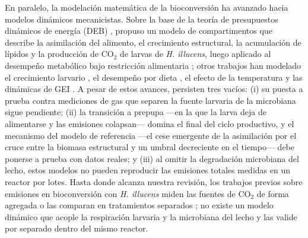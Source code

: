 En paralelo, la modelación matemática de la bioconversión ha avanzado hacia modelos dinámicos mecanicistas. Sobre la base de la teoría de presupuestos dinámicos de energía (DEB) \parencite{kooijmanDynamicEnergyBudget2009}, \textcite{eriksenDynamicModellingFeed2022} propuso un modelo de compartimentos que describe la asimilación del alimento, el crecimiento estructural, la acumulación de lípidos y la producción de CO$_2$ de larvas de \textit{H. illucens}, luego aplicado al desempeño metabólico bajo restricción alimentaria \parencite{eriksenMetabolicPerformanceFeed2024}; otros trabajos han modelado el crecimiento larvario \parencite{padmanabhaComprehensiveDynamicGrowth2020}, el desempeño por dieta \parencite{laganaroGrowthMetabolicPerformance2021a}, el efecto de la temperatura \parencite{schonEffectTemperatureGrowth2024} y las dinámicas de GEI \parencite{rossiEstimatingDynamicsGreenhouse2024a}. A pesar de estos avances, persisten tres vacíos: (i) su puesta a prueba contra mediciones de gas que separen la fuente larvaria de la microbiana sigue pendiente; (ii) la transición a prepupa ---en la que la larva deja de alimentarse y las emisiones colapsan--- domina el final del ciclo productivo, y el mecanismo del modelo de referencia ---el cese emergente de la asimilación por el cruce entre la biomasa estructural y un umbral decreciente en el tiempo--- debe ponerse a prueba con datos reales; y (iii) al omitir la degradación microbiana del lecho, estos modelos no pueden reproducir las emisiones totales medidas en un reactor por lotes. Hasta donde alcanza nuestra revisión, los trabajos previos sobre emisiones en bioconversión con \textit{H. illucens} miden las fuentes de CO$_2$ de forma agregada o las comparan en tratamientos separados \parencite{ermolaevGreenhouseGasEmissions2019,parodiBioconversionEfficienciesGreenhouse2020a,peredniaComparisonGreenhouseGas2017}; no existe un modelo dinámico que acople la respiración larvaria y la microbiana del lecho y las valide por separado dentro del mismo reactor.


